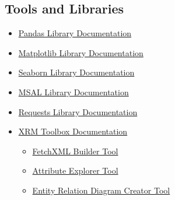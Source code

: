   
\subsection{Tools and Libraries}

\begin{itemize}
    \item \href{https://pandas.pydata.org/docs/}{Pandas Library Documentation}
    \item \href{https://matplotlib.org/stable/contents.html}{Matplotlib Library Documentation}
    \item \href{https://seaborn.pydata.org/}{Seaborn Library Documentation}
    \item \href{https://docs.microsoft.com/en-us/azure/active-directory/develop/msal-overview}{MSAL Library Documentation}
    \item \href{https://docs.python-requests.org/en/latest/}{Requests Library Documentation}
    \item \href{https://www.xrmtoolbox.com/documentation/}{XRM Toolbox Documentation}
    \begin{itemize}
        \item \href{https://fetchxmlbuilder.com/origdocs/}{FetchXML Builder Tool}
        \item \href{https://xrmdocs.cloudevolv.com/docs/attributeexporthelp.html}{Attribute Explorer Tool}
        \item \href{https://azurecodingarchitect.com/page/erd-creator/}{Entity Relation Diagram Creator Tool}
    \end{itemize}
\end{itemize}
